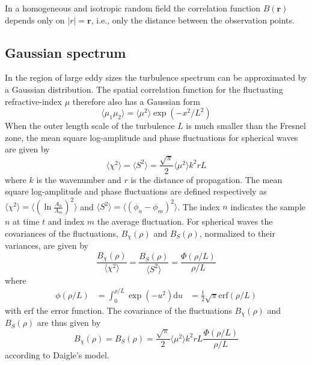 In a homogeneous and isotropic random field the correlation function $B(\mathbf{r})$ 
depends only on $|r|=\mathbf{r}$, i.e., only the distance between the observation points.



\subsection{Gaussian spectrum}
In the region of large eddy sizes the turbulence spectrum can be approximated by a Gaussian distribution.
The spatial correlation function for the fluctuating refractive-index $\mu$ therefore also has a Gaussian form
\begin{equation}
 \langle \mu_1 \mu_2 \rangle = \langle \mu^2 \rangle \exp{\left( -x^2 / L^2 \right)}
\end{equation}
When the outer length scale of the turbulence $L$ is much smaller than the Fresnel zone, 
the mean square log-amplitude and phase fluctuations for spherical waves are given by
\begin{equation}\label{eq:model_daigle}
 \langle \chi^2 \rangle = \langle S^2 \rangle = \frac{\sqrt{\pi}}{2} \langle \mu^2 \rangle k^2 r L 
\end{equation}
where $k$ is the wavenumber and $r$ is the distance of propagation.
The mean square log-amplitude and phase fluctuations are defined respectively as $\langle \chi^2 \rangle = \langle \left( \ln{\frac{A_{n}}{A_{m}}} \right) ^2 \rangle $
and $ \langle S^2 \rangle = \langle \left( \phi_n - \phi_m \right)^2  \rangle$. The index $n$ indicates the sample $n$ at time $t$ and index $m$ the average fluctuation.
For spherical waves the covariances of the fluctuations, $B_{\chi}(\rho)$ and $B_{S}(\rho)$, normalized to their variances, are given by
\begin{equation}
 \frac{B_{\chi} (\rho)}{\langle \chi^2 \rangle} = \frac{B_{S} (\rho)}{\langle S^2 \rangle} = \frac{\Phi\left(\rho/L\right)}{\rho/L}
\end{equation}
where 
\begin{align}
 \phi \left(\rho/L \right) &= \int_0^{\rho/L} \exp{\left(-u^2\right)} \mathrm{d} u 
 &= \frac{1}{2} \sqrt{\pi} \mathrm{erf}\left( \rho/L \right)
\end{align}
with $\mathrm{erf}$ the error function.
The covariance of the fluctuations $B_{\chi}(\rho)$ and $B_{S}(\rho)$ are thus given by
\begin{equation}
 B_{\chi} (\rho) = B_{S}(\rho) = \frac{\sqrt{\pi}}{2}  \langle \mu^2  \rangle k^2 r L 
\frac{\Phi(\rho/L) }{\rho / L}
\end{equation}
according to Daigle's model.

